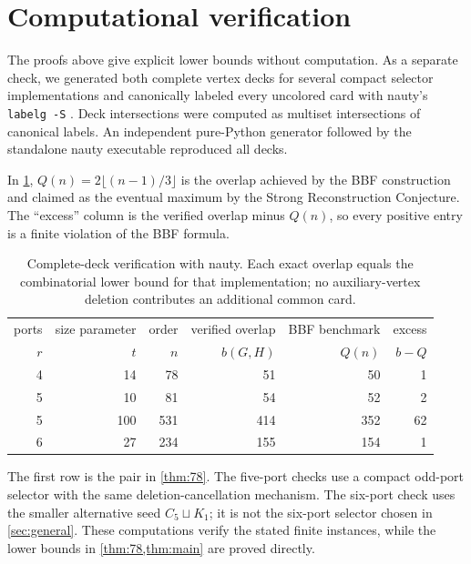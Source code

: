 \documentclass[11pt]{article}
\begin{document}
\section{Computational verification}\label{sec:experiment}
The proofs above give explicit lower bounds without computation. As a separate check, we generated both
complete vertex decks for several compact selector implementations and canonically labeled every
uncolored card with nauty's \texttt{labelg -S} \citep{MP14}. Deck intersections were computed as
multiset intersections of canonical labels. An independent pure-Python generator followed by the
standalone nauty executable reproduced all decks.

In \cref{tab:checks}, $Q(n)=2\lfloor(n-1)/3\rfloor$ is the overlap achieved by the BBF construction and
claimed as the eventual maximum by the Strong Reconstruction Conjecture. The ``excess'' column is the
verified overlap minus $Q(n)$, so every positive entry is a finite violation of the BBF formula.

\begin{table}[h]
\centering
\caption{Complete-deck verification with nauty. Each exact overlap equals the combinatorial lower bound
for that implementation; no auxiliary-vertex deletion contributes an additional common card.}
\label{tab:checks}
\begin{tabular}{@{}rrrrrr@{}}
\toprule
ports & size parameter & order & verified overlap & BBF benchmark & excess \\
$r$ & $t$ & $n$ & $b(G,H)$ & $Q(n)$ & $b-Q$ \\
\midrule
4 & 14  & 78  & 51  & 50  & 1  \\
5 & 10  & 81  & 54  & 52  & 2  \\
5 & 100 & 531 & 414 & 352 & 62 \\
6 & 27  & 234 & 155 & 154 & 1  \\
\bottomrule
\end{tabular}
\end{table}

The first row is the pair in \cref{thm:78}. The five-port checks use a compact odd-port selector with
the same deletion-cancellation mechanism. The six-port check uses the smaller alternative seed
$C_5\sqcup K_1$; it is not the six-port selector chosen in \cref{sec:general}. These computations verify
the stated finite instances, while the lower bounds in \cref{thm:78,thm:main} are proved directly.
\end{document}
